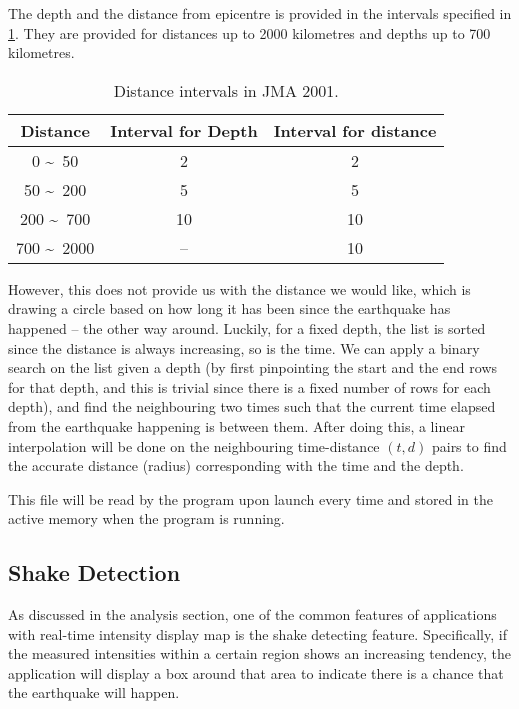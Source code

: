 The depth and the distance from epicentre is provided in the intervals specified in \ref{tab:dist-jma-2001}. They are provided for distances up to 2000 kilometres and depths up to 700 kilometres.

\begin{table}[htp]
    \centering

    \begin{tabular}{|c|c|c|}
        \hline
        Distance                  & Interval for Depth & Interval for distance \\
        \hline
        0 \textasciitilde\ 50     & 2                  & 2                     \\
        50 \textasciitilde\ 200   & 5                  & 5                     \\
        200 \textasciitilde\ 700  & 10                 & 10                    \\
        700 \textasciitilde\ 2000 & --                 & 10                    \\
        \hline
    \end{tabular}
    \caption{Distance intervals in JMA 2001.}
    \label{tab:dist-jma-2001}
\end{table}

However, this does not provide us with the distance we would like, which is drawing a circle based on how long it has been since the earthquake has happened -- the other way around. Luckily, for a fixed depth, the list is sorted since the distance is always increasing, so is the time. We can apply a binary search on the list given a depth (by first pinpointing the start and the end rows for that depth, and this is trivial since there is a fixed number of rows for each depth), and find the neighbouring two times such that the current time elapsed from the earthquake happening is between them. After doing this, a linear interpolation will be done on the neighbouring time-distance \((t, d)\) pairs to find the accurate distance (radius) corresponding with the time and the depth.

This file will be read by the program upon launch every time and stored in the active memory when the program is running.

\subsection{Shake Detection}

As discussed in the analysis section, one of the common features of applications with real-time intensity display map is the shake detecting feature. Specifically, if the measured intensities within a certain region shows an increasing tendency, the application will display a box around that area to indicate there is a chance that the earthquake will happen.

